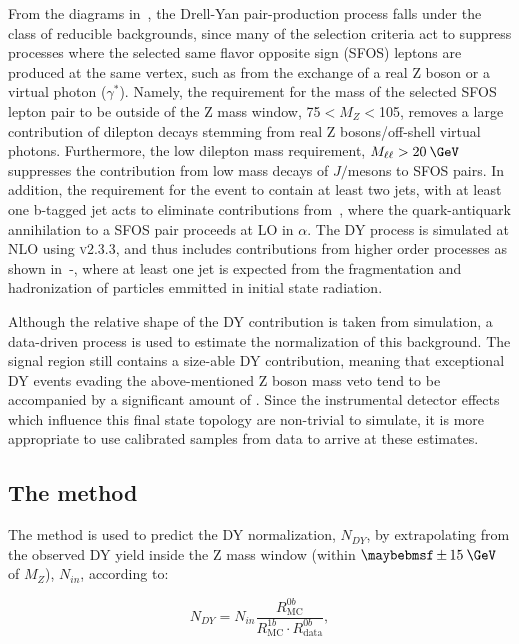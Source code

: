 From the diagrams in~, the Drell-Yan pair-production process falls under the class of reducible backgrounds, since many of the selection criteria act to suppress processes where the selected same flavor opposite sign (SFOS) leptons are produced at the same vertex, such as from the exchange of a real Z boson or a virtual photon ($\gamma^{*}$). Namely, the requirement for the mass of the selected SFOS lepton pair to be outside of the Z mass window, 75\:\GeV$< M_{Z} <$105\:\GeV, removes a large contribution of dilepton decays stemming from real Z bosons/off-shell virtual photons. Furthermore, the low dilepton mass requirement, $M_{\ell\ell}>20\:\GeV$ suppresses the contribution from low mass decays of $J/$\psi mesons to SFOS pairs. In addition, the requirement for the event to contain at least two jets, with at least one b-tagged jet acts to eliminate contributions from~, where the quark-antiquark annihilation to a SFOS pair proceeds at LO in $\alpha$. The DY process is simulated at NLO using \AMCATNLO \textsc{v2.3.3}, and thus includes contributions from higher order processes as shown in~-, where at least one jet is expected from the fragmentation and hadronization of particles emmitted in initial state radiation.

Although the relative shape of the DY contribution is taken from simulation, a data-driven process is used to estimate the normalization of this background. The signal region still contains a size-able DY contribution, meaning that exceptional DY events evading the above-mentioned Z boson mass veto tend to be accompanied by a significant amount of \ptmiss. Since the instrumental detector effects which influence this final state topology are non-trivial to simulate, it is more appropriate to use calibrated samples from data to arrive at these estimates.  

\subsection{The \Rinout method}

The method is used to predict the DY normalization, $N_{DY}$, by extrapolating from the observed DY yield inside the Z mass window (within $\pm15\:\GeV$ of $M_{Z}$), $N_{in}$, according to:

\begin{equation}
  N_{DY} = N_{in}\frac{R^{0b}_{\mathrm{MC}}}{R^{1b}_{\mathrm{MC}}\cdot R^{0b}_{\mathrm{data}}},
  \label{eq:NDY}
\end{equation}

